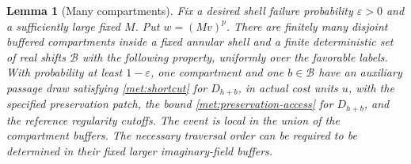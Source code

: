\documentclass[11pt]{article}
\numberwithin{equation}{section}
\newtheorem{lemma}[theorem]{Lemma}
\theoremstyle{definition}
\theoremstyle{remark}
\newcommand{\1}{\mathbf 1}
\begin{document}
\begin{lemma}[Many compartments]
\label{met:amplification}
Fix a desired shell failure probability $\varepsilon>0$ and a
sufficiently large fixed $M$.  Put $w=(Mv)^p$.  There are finitely
many disjoint buffered compartments inside a fixed annular shell and
a finite deterministic set of real shifts $\mathcal B$ with the
following property, uniformly over the favorable labels.  With
probability at least $1-\varepsilon$, one compartment and one
$b\in\mathcal B$ have an auxiliary passage draw satisfying
\eqref{met:shortcut} for $D_{h+b}$, in actual cost units $u$, with the
specified preservation patch, the bound
\eqref{met:preservation-access} for $D_{h+b}$, and the reference
regularity cutoffs.
The event is local in the union of the compartment buffers.  The
necessary traversal order can be required to be determined in their
fixed larger imaginary-field buffers.
\end{lemma}
\end{document}
